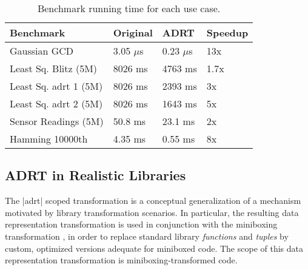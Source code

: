 \begin{table}[t!]
  \centering
  \begin{tabularx}{0.48\textwidth}{|g *{3}{|Y}|} \hline
    \textbf{Benchmark}   &  \textbf{Original}  &     \textbf{ADRT} &      \textbf{Speedup} \\ \hline
    Gaussian GCD         &        3.05 $\mu$s &      0.23 $\mu$s &                   13x \\
    Least Sq. Blitz (5M) &             8026 ms &           4763 ms &                  1.7x \\
    Least Sq. adrt 1 (5M) &             8026 ms &           2393 ms &                    3x \\
    Least Sq. adrt 2 (5M) &             8026 ms &           1643 ms &                    5x \\
    Sensor Readings (5M) &             50.8 ms &           23.1 ms &                    2x \\
    Hamming 10000th      &             4.35 ms &           0.55 ms &                    8x \\ \hline
  \end{tabularx}
  \vspace{-2mm}
  \caption{Benchmark running time for each use case.}
  \label{table:adrt}
  \vspace{-1em }
\end{table}

\subsection{ADRT in Realistic Libraries}
\label{sec:benchmarks:funcs}


The |adrt| scoped transformation is a conceptual generalization of a mechanism
motivated by library transformation scenarios. In particular, the
resulting data representation transformation is used in conjunction
with the miniboxing transformation \cite{miniboxing-www, miniboxing},
in order to replace standard library \emph{functions} and \emph{tuples}
by custom, optimized versions adequate for miniboxed code.
The scope of this data representation transformation is miniboxing-transformed code.

